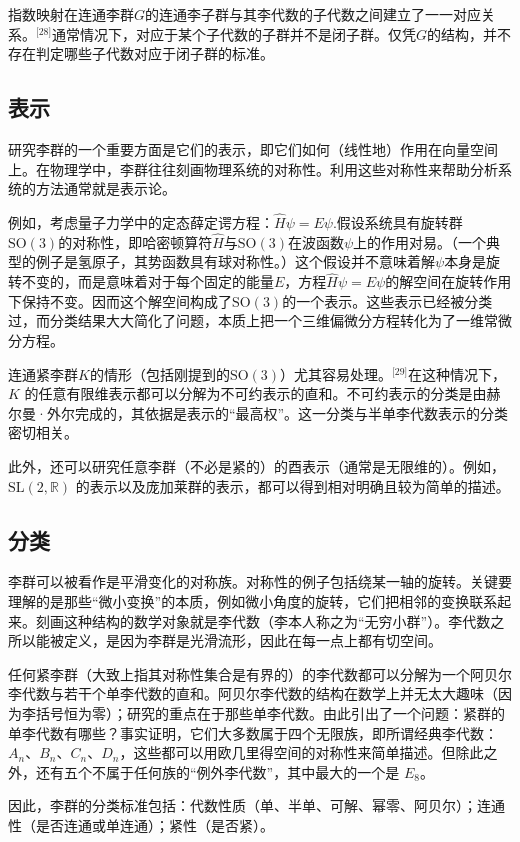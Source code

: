 指数映射在连通李群$G$的连通李子群与其李代数的子代数之间建立了一一对应关系。\(^\text{[28]}\)通常情况下，对应于某个子代数的子群并不是闭子群。仅凭$G$的结构，并不存在判定哪些子代数对应于闭子群的标准。
\subsection{表示}
研究李群的一个重要方面是它们的表示，即它们如何（线性地）作用在向量空间上。在物理学中，李群往往刻画物理系统的对称性。利用这些对称性来帮助分析系统的方法通常就是表示论。

例如，考虑量子力学中的定态薛定谔方程：$\hat{H}\psi = E\psi$.假设系统具有旋转群$\mathrm{SO}(3)$的对称性，即哈密顿算符$\hat{H}$与$\mathrm{SO}(3)$在波函数$\psi$上的作用对易。（一个典型的例子是氢原子，其势函数具有球对称性。）这个假设并不意味着解$\psi$本身是旋转不变的，而是意味着对于每个固定的能量$E$，方程$\hat{H}\psi = E\psi$的解空间在旋转作用下保持不变。因而这个解空间构成了$\mathrm{SO}(3)$的一个表示。这些表示已经被分类过，而分类结果大大简化了问题，本质上把一个三维偏微分方程转化为了一维常微分方程。

连通紧李群$K$的情形（包括刚提到的$\mathrm{SO}(3)$）尤其容易处理。\(^\text{[29]}\)在这种情况下，$K$ 的任意有限维表示都可以分解为不可约表示的直和。不可约表示的分类是由赫尔曼·外尔完成的，其依据是表示的“最高权”。这一分类与半单李代数表示的分类密切相关。

此外，还可以研究任意李群（不必是紧的）的酉表示（通常是无限维的）。例如，$\mathrm{SL}(2,\mathbb{R})$ 的表示以及庞加莱群的表示，都可以得到相对明确且较为简单的描述。
\subsection{分类}
李群可以被看作是平滑变化的对称族。对称性的例子包括绕某一轴的旋转。关键要理解的是那些“微小变换”的本质，例如微小角度的旋转，它们把相邻的变换联系起来。刻画这种结构的数学对象就是李代数（李本人称之为“无穷小群”）。李代数之所以能被定义，是因为李群是光滑流形，因此在每一点上都有切空间。

任何紧李群（大致上指其对称性集合是有界的）的李代数都可以分解为一个阿贝尔李代数与若干个单李代数的直和。阿贝尔李代数的结构在数学上并无太大趣味（因为李括号恒为零）；研究的重点在于那些单李代数。由此引出了一个问题：紧群的单李代数有哪些？事实证明，它们大多数属于四个无限族，即所谓经典李代数：$A_n$、$B_n$、$C_n$、$D_n$，这些都可以用欧几里得空间的对称性来简单描述。但除此之外，还有五个不属于任何族的“例外李代数”，其中最大的一个是 $E_8$。

因此，李群的分类标准包括：代数性质（单、半单、可解、幂零、阿贝尔）；连通性（是否连通或单连通）；紧性（是否紧）。

